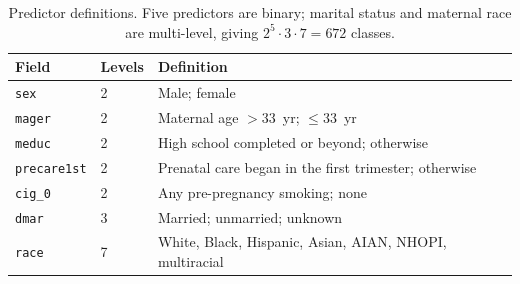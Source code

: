 \begin{table}[ht]
\caption{Predictor definitions. Five predictors are binary; marital status and
maternal race are multi-level, giving $2^{5}\cdot3\cdot7=672$ classes.}
\label{tab:vars}
\centering
\small
\begin{tabular}{@{}llp{3.4cm}@{}}
\toprule
\textbf{Field} & \textbf{Levels} & \textbf{Definition} \\ \midrule
\texttt{sex}        & 2 & Male; female \\
\texttt{mager}      & 2 & Maternal age $>33$~yr; $\le 33$~yr \\
\texttt{meduc}      & 2 & High school completed or beyond; otherwise \\
\texttt{precare1st} & 2 & Prenatal care began in the first trimester; otherwise \\
\texttt{cig\_0}     & 2 & Any pre-pregnancy smoking; none \\
\texttt{dmar}       & 3 & Married; unmarried; unknown \\
\texttt{race}       & 7 & White, Black, Hispanic, Asian, AIAN, NHOPI, multiracial \\
\bottomrule
\end{tabular}
\end{table}
